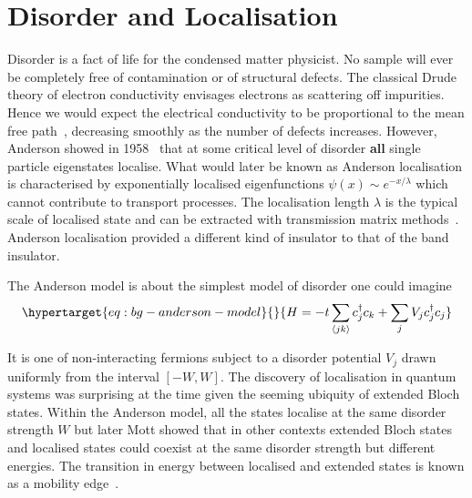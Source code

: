 \hypertarget{bg-disorder-and-localisation}{%
\section{Disorder and Localisation}\label{bg-disorder-and-localisation}}

Disorder is a fact of life for the condensed matter physicist. No sample will ever be completely free of contamination or of structural defects. The classical Drude theory of electron conductivity envisages electrons as scattering off impurities. Hence we would expect the electrical conductivity to be proportional to the mean free path~\autocite{lagendijkFiftyYearsAnderson2009}, decreasing smoothly as the number of defects increases. However, Anderson showed in 1958~\autocite{andersonAbsenceDiffusionCertain1958} that at some critical level of disorder \textbf{all} single particle eigenstates localise. What would later be known as Anderson localisation is characterised by exponentially localised eigenfunctions \(\psi(x) \sim e^{-x/\lambda}\) which cannot contribute to transport processes. The localisation length \(\lambda\) is the typical scale of localised state and can be extracted with transmission matrix methods~\autocite{pendrySymmetryTransportWaves1994}. Anderson localisation provided a different kind of insulator to that of the band insulator.

The Anderson model is about the simplest model of disorder one could imagine \begin{equation}\protect\hypertarget{eq:bg-anderson-model}{}{
H = -t\sum_{\langle jk \rangle} c^\dagger_j c_k + \sum_j V_j c_j^\dagger c_j
}\label{eq:bg-anderson-model}\end{equation}

It is one of non-interacting fermions subject to a disorder potential \(V_j\) drawn uniformly from the interval \([-W,W]\). The discovery of localisation in quantum systems was surprising at the time given the seeming ubiquity of extended Bloch states. Within the Anderson model, all the states localise at the same disorder strength \(W\) but later Mott showed that in other contexts extended Bloch states and localised states could coexist at the same disorder strength but different energies. The transition in energy between localised and extended states is known as a mobility edge~\autocite{mottMetalInsulatorTransitions1978}.

